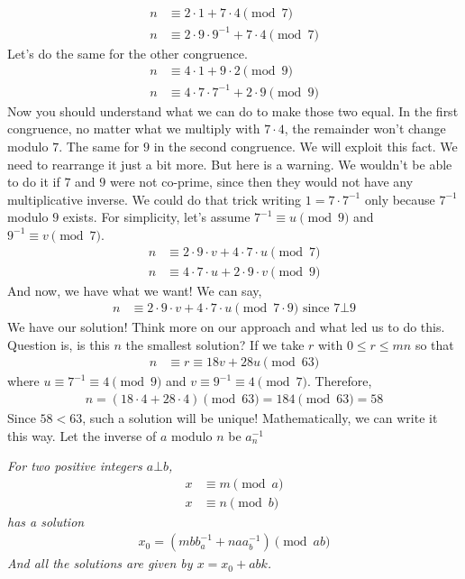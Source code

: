 \documentclass{subfile}
\begin{document}
	\begin{align*}
	n & \equiv2\cdot1+7\cdot4\pmod7\\
	n & \equiv2\cdot9\cdot9^{-1}+7\cdot4\pmod{7}
	\end{align*}
	Let's do the same for the other congruence.
	\begin{align*}
	n & \equiv4\cdot1+9\cdot2\pmod{9}\\
	n & \equiv4\cdot7\cdot7^{-1}+2\cdot9\pmod{9}
	\end{align*}
	Now you should understand what we can do to make those two equal. In the first congruence, no matter what we multiply with $7\cdot4$, the remainder won't change modulo $7$. The same for $9$ in the second congruence. We will exploit this fact. We need to rearrange it just a bit more. But here is a warning. We wouldn't be able to do it if $7$ and $9$ were not co-prime, since then they would not have any multiplicative inverse. We could do that trick writing $1=7\cdot7^{-1}$ only because $7^{-1}$ modulo $9$ exists. For simplicity, let's assume $7^{-1}\equiv u\pmod{9}$ and $9^{-1}\equiv v\pmod{7}$.
	\begin{align*}
	n & \equiv2\cdot9\cdot v+4\cdot7\cdot u\pmod{7}\\
	n & \equiv4\cdot7\cdot u+2\cdot9\cdot v\pmod{9}
	\end{align*}
	And now, we have what we want! We can say,
	\begin{align*}
	n & \equiv2\cdot9\cdot v+4\cdot7\cdot u\pmod{7\cdot9}\text { since }7\bot 9
	\end{align*}
	We have our solution! Think more on our approach and what led us to do this. Question is, is this $n$ the smallest solution? If we take $r$ with $0\leq r\leq mn$ so that
	\begin{align*}
	n & \equiv r\equiv18v+28u\pmod{63}
	\end{align*}
	where $u\equiv7^{-1}\equiv4\pmod9$ and $v\equiv9^{-1}\equiv4\pmod 7$. Therefore,
	\begin{align*}
	n = (18\cdot4+28\cdot4)\pmod{63}=184\pmod{63}=58
	\end{align*}
	Since $58<63$, such a solution will be unique! Mathematically, we can write it this way. Let the inverse of $a$ modulo $n$ be $a^{-1}_n$
	\begin{theorem}\slshape
		For two positive integers $a\bot b$,
		\begin{align*}
		x & \equiv m\pmod a\\
		x & \equiv n\pmod b
		\end{align*}
		has a solution 
		\begin{align*}
		x_0 = (mbb^{-1}_a+naa^{-1}_b)\pmod{ab}
		\end{align*}
		And all the solutions are given by $x=x_0+abk$.
	\end{theorem}
\end{document}
